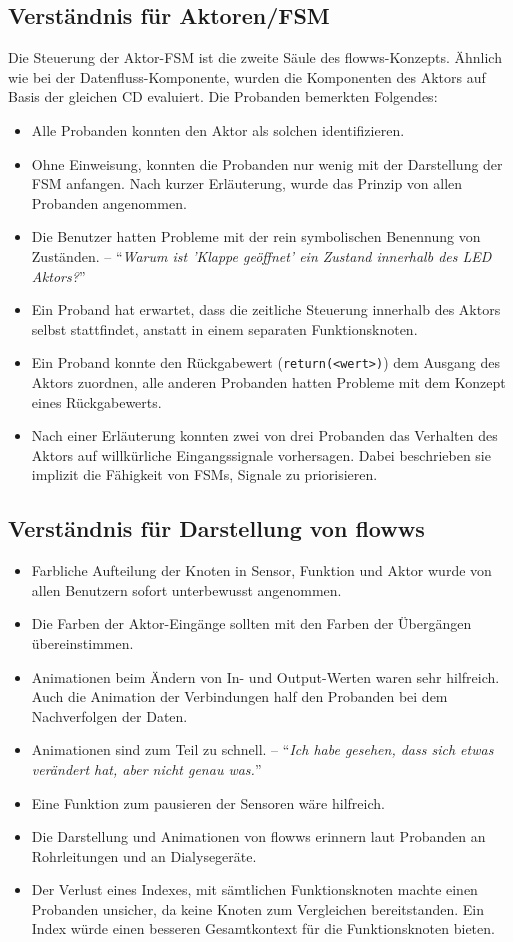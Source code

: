 \subsection*{Verständnis für Aktoren/\ac{FSM}} 
Die Steuerung der Aktor-\ac{FSM} ist die zweite Säule des flowws-Konzepts. Ähnlich wie bei der Datenfluss-Komponente, wurden die Komponenten des Aktors auf Basis der gleichen \ac{CD} evaluiert. Die Probanden bemerkten Folgendes:
\begin{itemize}
    \item Alle Probanden konnten den Aktor als solchen identifizieren.
    \item Ohne Einweisung, konnten die Probanden nur wenig mit der Darstellung der \ac{FSM} anfangen. Nach kurzer Erläuterung, wurde das Prinzip von allen Probanden angenommen.
    \item Die Benutzer hatten Probleme mit der rein symbolischen Benennung von Zuständen. -- "`\textit{Warum ist 'Klappe geöffnet' ein Zustand innerhalb des LED Aktors?}"' 
    \item Ein Proband hat erwartet, dass die zeitliche Steuerung innerhalb des Aktors selbst stattfindet, anstatt in einem separaten Funktionsknoten.
    \item Ein Proband konnte den Rückgabewert (\texttt{return(<wert>)}) dem Ausgang des Aktors zuordnen, alle anderen Probanden hatten Probleme mit dem Konzept eines Rückgabewerts.
    \item Nach einer Erläuterung konnten zwei von drei Probanden das Verhalten des Aktors auf willkürliche Eingangssignale vorhersagen. Dabei beschrieben sie implizit die Fähigkeit von \acp{FSM}, Signale zu priorisieren.
\end{itemize}

\subsection*{Verständnis für Darstellung von flowws}
\begin{itemize}
    \item Farbliche Aufteilung der Knoten in Sensor, Funktion und Aktor wurde von allen Benutzern sofort unterbewusst angenommen.
    \item Die Farben der Aktor-Eingänge sollten mit den Farben der Übergängen übereinstimmen.
    \item Animationen beim Ändern von In- und Output-Werten waren sehr hilfreich. Auch die Animation der Verbindungen half den Probanden bei dem Nachverfolgen der Daten.
    \item Animationen sind zum Teil zu schnell. -- "`\textit{Ich habe gesehen, dass sich etwas verändert hat, aber nicht genau was.}"'
    \item Eine Funktion zum pausieren der Sensoren wäre hilfreich.
    \item Die Darstellung und Animationen von flowws erinnern laut Probanden an Rohrleitungen und an Dia\-lyse\-ge\-räte.    
    \item Der Verlust eines Indexes, mit sämtlichen Funktionsknoten machte einen Probanden unsicher, da keine Knoten zum Vergleichen bereitstanden. Ein Index würde einen besseren Gesamtkontext für die Funktionsknoten bieten. 
\end{itemize}

